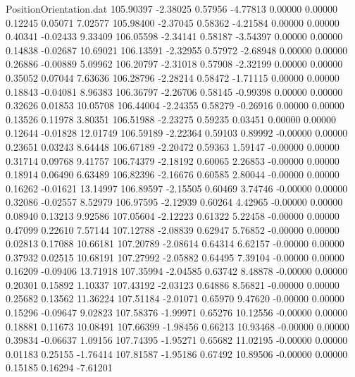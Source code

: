 \begin{filecontents}{PositionOrientation.dat}
 105.90397   -2.38025    0.57956    -4.77813    0.00000    0.00000    0.12245    0.05071    7.02577
 105.98400   -2.37045    0.58362    -4.21584    0.00000    0.00000    0.40341   -0.02433    9.33409
 106.05598   -2.34141    0.58187    -3.54397    0.00000    0.00000    0.14838   -0.02687   10.69021
 106.13591   -2.32955    0.57972    -2.68948    0.00000    0.00000    0.26886   -0.00889    5.09962
 106.20797   -2.31018    0.57908    -2.32199    0.00000    0.00000    0.35052    0.07044    7.63636
 106.28796   -2.28214    0.58472    -1.71115    0.00000    0.00000    0.18843   -0.04081    8.96383
 106.36797   -2.26706    0.58145    -0.99398    0.00000    0.00000    0.32626    0.01853   10.05708
 106.44004   -2.24355    0.58279    -0.26916    0.00000    0.00000    0.13526    0.11978    3.80351
 106.51988   -2.23275    0.59235     0.03451    0.00000    0.00000    0.12644   -0.01828   12.01749
 106.59189   -2.22364    0.59103     0.89992   -0.00000    0.00000    0.23651    0.03243    8.64448
 106.67189   -2.20472    0.59363     1.59147   -0.00000    0.00000    0.31714    0.09768    9.41757
 106.74379   -2.18192    0.60065     2.26853   -0.00000    0.00000    0.18914    0.06490    6.63489
 106.82396   -2.16676    0.60585     2.80044   -0.00000    0.00000    0.16262   -0.01621   13.14997
 106.89597   -2.15505    0.60469     3.74746   -0.00000    0.00000    0.32086   -0.02557    8.52979
 106.97595   -2.12939    0.60264     4.42965   -0.00000    0.00000    0.08940    0.13213    9.92586
 107.05604   -2.12223    0.61322     5.22458   -0.00000    0.00000    0.47099    0.22610    7.57144
 107.12788   -2.08839    0.62947     5.76852   -0.00000    0.00000    0.02813    0.17088   10.66181
 107.20789   -2.08614    0.64314     6.62157   -0.00000    0.00000    0.37932    0.02515   10.68191
 107.27992   -2.05882    0.64495     7.39104   -0.00000    0.00000    0.16209   -0.09406   13.71918
 107.35994   -2.04585    0.63742     8.48878   -0.00000    0.00000    0.20301    0.15892    1.10337
 107.43192   -2.03123    0.64886     8.56821   -0.00000    0.00000    0.25682    0.13562   11.36224
 107.51184   -2.01071    0.65970     9.47620   -0.00000    0.00000    0.15296   -0.09647    9.02823
 107.58376   -1.99971    0.65276    10.12556   -0.00000    0.00000    0.18881    0.11673   10.08491
 107.66399   -1.98456    0.66213    10.93468   -0.00000    0.00000    0.39834   -0.06637    1.09156
 107.74395   -1.95271    0.65682    11.02195   -0.00000    0.00000    0.01183    0.25155   -1.76414
 107.81587   -1.95186    0.67492    10.89506   -0.00000    0.00000    0.15185    0.16294   -7.61201

\end{filecontents}
